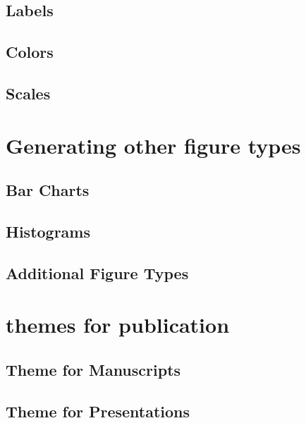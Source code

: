 \documentclass[nojss]{jss}\usepackage[]{graphicx}\usepackage[]{color}
\begin{document}
\subsection{Labels}\label{S:labels}

\subsection{Colors}\label{S:colors}


\subsection{Scales}\label{S:scales}

\section{Generating other figure types}\label{S:alternateFigures}

\subsection{Bar Charts}

\subsection{Histograms}

\subsection{Additional Figure Types}


\section[Themes for publications]{ themes for publication}\label{S:themes}

\subsection{Theme for Manuscripts}

\subsection{Theme for Presentations}
\end{document}

